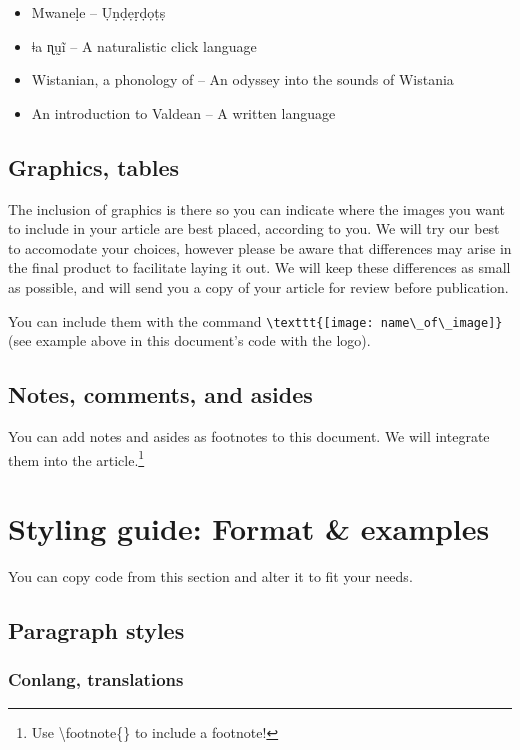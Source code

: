 \begin{itemize}
    \item Mwaneḷe -- Ụṇḍẹṛḍọṭṣ
    \item ǂa ɳṵĩ -- A naturalistic click language
    \item Wistanian, a phonology of -- An odyssey into the sounds of Wistania
    \item An introduction to Valdean -- A written language
\end{itemize}

\subsection*{Graphics, tables}

The inclusion of graphics is there so you can indicate where the images you want to include in your article are best placed, according to you. We will try our best to accomodate your choices, however please be aware that differences may arise in the final product to facilitate laying it out. We will keep these differences as small as possible, and will send you a copy of your article for review before publication.

You can include them with the command \verb|\texttt{[image: name\_of\_image]}| (see example above in this document's code with the logo).

\subsection*{Notes, comments, and asides}

You can add notes and asides as footnotes to this document. We will integrate them into the article.\footnote{Use \textbackslash footnote\{\} to include a footnote!}




\newpage




\section*{Styling guide: Format \& examples}

You can copy code from this section and alter it to fit your needs.

\subsection*{Paragraph styles}

\subsubsection*{Conlang, translations}

